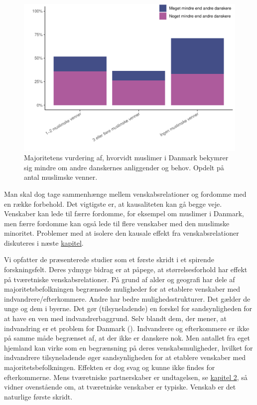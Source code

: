 \documentclass[
]{book}
\begin{document}
\begin{figure}
\includegraphics[width=1\linewidth]{en-befolkning-blander-sig_files/figure-latex/fig-6-5-1} \caption{Majoritetens vurdering af, hvorvidt muslimer i Danmark bekymrer sig mindre om andre danskernes anliggender og behov. Opdelt på antal muslimske venner.}\label{fig:fig-6-5}
\end{figure}

Man skal dog tage sammenhænge mellem venskabsrelationer og fordomme med en række forbehold. Det vigtigste er, at kausaliteten kan gå begge veje. Venskaber kan lede til færre fordomme, for eksempel om muslimer i Danmark, men færre fordomme kan også lede til flere venskaber med den muslimske minoritet. Problemer med at isolere den kausale effekt fra venskabsrelationer diskuteres i næste \hyperref[kap7]{kapitel}.

Vi opfatter de præsenterede studier som et første skridt i et spirende forskningsfelt. Deres ydmyge bidrag er at påpege, at størrelsesforhold har effekt på tværetniske venskabsrelationer. På grund af alder og geografi har dele af majoritetsbefolkningen begrænsede muligheder for at etablere venskaber med indvandrere/efterkommere. Andre har bedre mulighedsstrukturer. Det gælder de unge og dem i byerne. Det gør (tilsyneladende) en forskel for sandsynligheden for at have en ven med indvandrerbaggrund. Selv blandt dem, der mener, at indvandring er et problem for Danmark (). Indvandrere og efterkommere er ikke på samme måde begrænset af, at der ikke er danskere nok. Men antallet fra eget hjemland kan virke som en begrænsning på deres venskabsmuligheder, hvilket for indvandrere tilsyneladende øger sandsynligheden for at etablere venskaber med majoritetsbefolkningen. Effekten er dog svag og kunne ikke findes for efterkommerne. Mens tværetniske partnerskaber er undtagelsen, se \hyperref[kap2]{kapitel 2}, så vidner ovenstående om, at tværetniske venskaber er typiske. Venskab er det naturlige første skridt.
\end{document}
